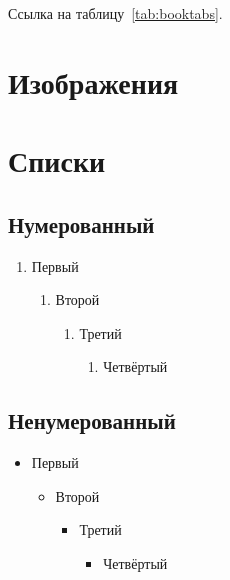 \documentclass[font=modern]{cmcmsuthesis-cw}
\begin{document}
Ссылка на таблицу~\ref{tab:booktabs}.

\section{Изображения}

%
%

\section{Списки}

\subsection{Нумерованный}
\begin{enumerate}
\item Первый\begin{enumerate}
\item Второй\begin{enumerate}
\item Третий\begin{enumerate}
\item Четвёртый\end{enumerate}\end{enumerate}\end{enumerate}
\end{enumerate}

\subsection{Ненумерованный}
\begin{itemize}
\item Первый\begin{itemize}
\item Второй\begin{itemize}
\item Третий\begin{itemize}
\item Четвёртый\end{itemize}\end{itemize}\end{itemize}
\end{itemize}
\end{document}
